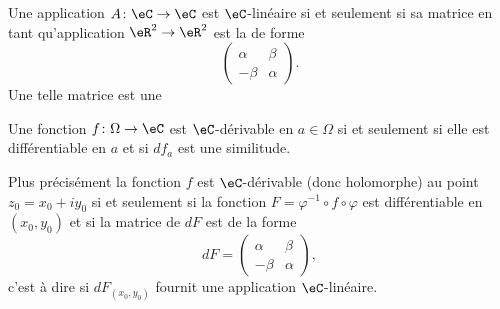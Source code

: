 \begin{lemma}
    Une application \( A\colon \eC\to \eC\) est \( \eC\)-linéaire si et seulement si sa matrice en tant qu'application \( \eR^2\to \eR^2\) est la de forme
    \begin{equation}
        \begin{pmatrix}
            \alpha    &   \beta    \\ 
            -\beta    &   \alpha    
        \end{pmatrix}.
    \end{equation}
    Une telle matrice est une 
\end{lemma}

\begin{proposition}
    Une fonction \( f\colon \Omega\to \eC\) est $\eC$-dérivable en \( a\in\Omega\) si et seulement si elle est différentiable en \( a\) et si \( df_a\) est une similitude.

    Plus précisément la fonction \( f\) est $\eC$-dérivable (donc holomorphe) au point \( z_0=x_0+iy_0\) si et seulement si la fonction \( F=\varphi^{-1}\circ f\circ \varphi\) est différentiable en \( (x_0,y_0)\) et si la matrice de \( dF\) est de la forme
    \begin{equation}
        dF=\begin{pmatrix}
            \alpha    &   \beta    \\ 
            -\beta    &   \alpha    
        \end{pmatrix},
    \end{equation}
    c'est à dire si \( dF_{(x_0,y_0)}\) fournit une application \( \eC\)-linéaire.
\end{proposition}


